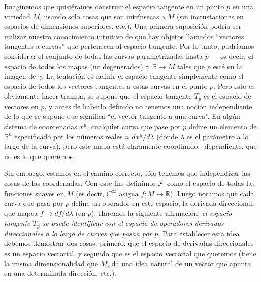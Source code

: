 \documentclass[11pt,b5paper,openany,twoside]{book}
\newcommand{\R}{\mathbb{R}}
\begin{document}
Imaginemos que quisiéramos construir el espacio tangente en un punto $p$ en una variedad $M$, usando solo cosas que son intrínsecas a $M$ (sin incrustaciones en espacios de dimensiones superiores, etc.).
Una primera suposición podría ser utilizar nuestro conocimiento intuitivo de que hay objetos llamados ``vectores tangentes a curvas'' que pertenecen al espacio tangente.
Por lo tanto, podríamos considerar el conjunto de todas las curvas parametrizadas hasta $p$ --- es decir, el espacio de todos los mapas (no degenerados) $\gamma:\R\rightarrow M$ tales que $p$ esté en la imagen de $\gamma$.
La tentación es definir el espacio tangente simplemente como el espacio de todos los vectores tangentes a estas curvas en el punto $p$.
Pero esto es obviamente hacer trampa; se supone que el espacio tangente $T_p$ es el espacio de vectores en $p$, y antes de haberlo definido no tenemos una noción independiente de lo que se supone que significa ``el vector tangente a una curva''.
En algún sistema de coordenadas $x^\mu$, cualquier curva que pase por $p$ define un elemento de $\R^n$ especificado por los números reales $n$ $dx^\mu/d\lambda$ (donde $\lambda$ es el parámetro a lo largo de la curva), pero este mapa está claramente coordinado. -dependiente, que no es lo que queremos.

Sin embargo, estamos en el camino correcto, sólo tenemos que independizar las cosas de las coordenadas.
Con este fin, definimos ${\cal F}$ como el espacio de todas las funciones suaves en $M$ (es decir, $C^\infty$ asigna $f:M\rightarrow \R$).
Luego notamos que cada curva que pasa por $p$ define un operador en este espacio, la derivada direccional, que mapea $f\rightarrow df/d\lambda$ (en $p$).
Haremos la siguiente afirmación: {\it el espacio tangente $T_p$ se puede identificar con el espacio de operadores derivados direccionales a lo largo de curvas que pasan por $p$}.
Para establecer esta idea debemos demostrar dos cosas: primero, que el espacio de derivadas direccionales es un espacio vectorial, y segundo que es el espacio vectorial que queremos (tiene la misma dimensionalidad que $M$, da una idea natural de un vector que apunta en una determinada dirección, etc.).
\end{document}
